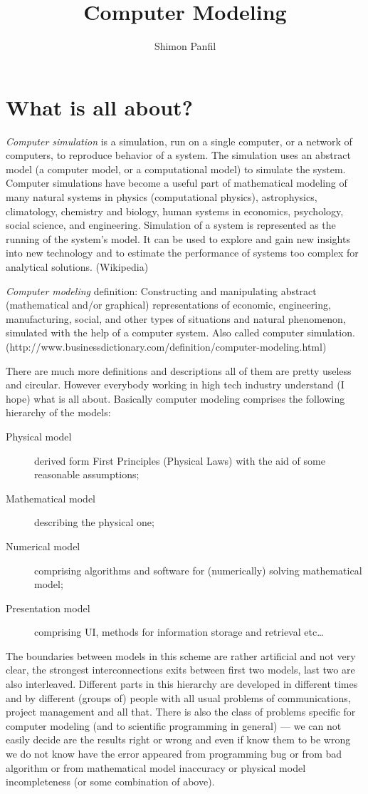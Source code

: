 \documentclass[12pt]{article}
\title{Computer Modeling}
\author{Shimon Panfil}
\begin{document}
\maketitle
\section{What is all about?}
{\em Computer simulation} is a simulation, run on a single computer, or a network of computers, to reproduce behavior of a system. The simulation uses an abstract model (a computer model, or a computational model) to simulate the system. Computer simulations have become a useful part of mathematical modeling of many natural systems in physics (computational physics), astrophysics, climatology, chemistry and biology, human systems in economics, psychology, social science, and engineering. Simulation of a system is represented as the running of the system's model. It can be used to explore and gain new insights into new technology and to estimate the performance of systems too complex for analytical solutions. (Wikipedia)

{\em  Computer modeling} definition: Constructing and manipulating abstract (mathematical and/or graphical) representations of economic, engineering, manufacturing, social, and other types of situations and natural phenomenon, simulated with the help of a computer system. Also called computer simulation.
(http://www.businessdictionary.com/definition/computer-modeling.html)

There are much more definitions and descriptions all of them are pretty useless and circular. However everybody working in high tech industry understand (I hope) what is all about.  Basically computer modeling comprises the following hierarchy of the models:
\begin{description}
\item [Physical model] derived form First Principles (Physical Laws) with the aid of some reasonable assumptions;
\item [Mathematical model] describing the physical one;
\item [Numerical model] comprising algorithms and software for (numerically) solving mathematical model;
\item [Presentation model] comprising UI, methods for information storage and retrieval etc\ldots
\end{description}
The boundaries between models in this scheme are rather artificial and not very clear, the strongest interconnections exits between first two models,
last two are also interleaved. Different parts in this hierarchy are developed in different times and by different (groups of) people with all usual problems of communications, project management and all that. There is also the class of problems specific for computer modeling (and to scientific programming in general) --- we can not easily decide are the results right or wrong and even if know them to be wrong we do not know have the error appeared from programming bug or from bad algorithm or   from mathematical  model inaccuracy or physical model incompleteness (or some combination of above). 
\end{document}
